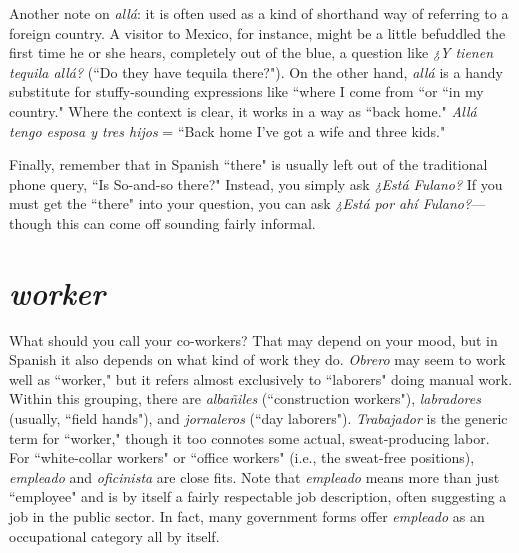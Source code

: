 Another note on \emph{allá}: it is often used as a kind of shorthand
way of referring to a foreign country. A visitor to Mexico, for instance,
might be a little befuddled the first time he or she hears, completely
out of the blue, a question like \emph{¿Y tienen tequila allá?} (``Do they have
tequila there?"). On the other hand, \emph{allá} is a handy substitute for
stuffy-sounding expressions like ``where I come from ``or ``in my country." Where the context is clear, it works in a way as ``back home."
\emph{Allá tengo esposa y tres hijos} = ``Back home I've got a wife and
three kids."

Finally, remember that in Spanish ``there" is usually left out of
the traditional phone query, ``Is So-and-so there?" Instead, you simply
ask \emph{¿Está Fulano?} If you must get the ``there" into your question, you
can ask \emph{¿Está por ahí Fulano?}---though this can come off sounding
fairly informal.

\section{\emph{worker}}

What should you call your co-workers? That may depend on
your mood, but in Spanish it also depends on what kind of work they
do. \emph{Obrero} may seem to work well as ``worker," but it refers almost
exclusively to ``laborers" doing manual work. Within this grouping,
there are \emph{albañiles} (``construction workers"), \emph{labradores} (usually,
``field hands"), and \emph{jornaleros} (``day laborers"). \emph{Trabajador} is the generic term for ``worker," though it too connotes some actual, sweat-producing labor. For ``white-collar workers" or ``office workers" (i.e.,
the sweat-free positions), \emph{empleado} and \emph{oficinista} are close fits. Note
that \emph{empleado} means more than just ``employee" and is by itself a
fairly respectable job description, often suggesting a job in the public
sector. In fact, many government forms offer \emph{empleado} as an occupational category all by itself.


